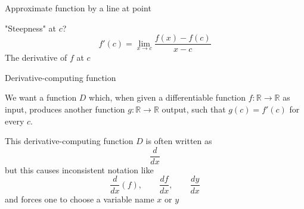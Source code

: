 \documentclass[12pt,aspectratio=169,handout]{beamer}
\begin{document}
\begin{frame}{Approximate function by a line at point}
	
	

\begin{figure}
\end{figure}


	
	
	
	
	"Steepness" at $c$?
	$$f'(c) = \lim_{x \to c} \frac{f(x) - f(c)}{x - c}$$
	The derivative of $f$ at $c$
	
	
	
	
	
\end{frame}


\begin{frame}{Derivative-computing function}
	
	We want a function $D$ which, when given a differentiable function $f : \mathbb{R} \to \mathbb{R}$ as input, produces another function $g : \mathbb{R} \to \mathbb{R}$ output, such that $g(c) = f'(c)$ for every $c$.
	
	\bigskip
	\pause
	This derivative-computing function $D$ is often written as 
	$$\frac{d}{dx}$$
	but this causes inconsistent notation like
	$$\frac{d}{dx}(f), \qquad \frac{df}{dx}, \qquad \frac{dy}{dx}$$
	and forces one to choose a variable name $x$ or $y$
	
\end{frame}
\end{document}
